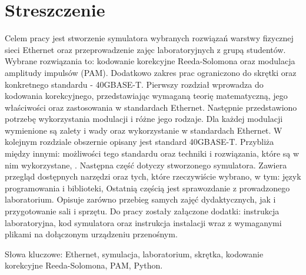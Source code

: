 \section{Streszczenie}

Celem pracy jest stworzenie symulatora wybranych rozwiązań warstwy fizycznej sieci Ethernet oraz przeprowadzenie zajęc laboratoryjnych z grupą studentów. Wybrane rozwiązania to: kodowanie korekcyjne Reeda-Solomona oraz modulacja amplitudy impulsów (PAM). Dodatkowo zakres prac ograniczono do skrętki oraz konkretnego standardu - 40GBASE-T. Pierwszy rozdział wprowadza do kodowania korekcyjnego, przedstawiając wymaganą teorię matematyczną, jego właściwości oraz zastosowania w standardach Ethernet. Następnie przedstawiono potrzebę wykorzystania modulacji i różne jego rodzaje. Dla każdej modulacji wymienione są zalety i wady oraz wykorzystanie w standardach Ethernet. W kolejnym rozdziale obszernie opisany jest standard 40GBASE-T. Przybliża między innymi: możliwości tego standardu oraz techniki i rozwiązania, które są w nim wykorzystane, . Następna część dotyczy stworzonego symulatora. Zawiera przegląd dostępnych narzędzi oraz tych, które rzeczywiście wybrano, w tym: język programowania i biblioteki, Ostatnią częścią jest sprawozdanie z prowadzonego laboratorium. Opisuje zarówno przebieg samych zajęć dydaktycznych, jak i przygotowanie sali i sprzętu. Do pracy zostały załączone dodatki: instrukcja laboratoryjna, kod symulatora oraz instrukcja instalacji wraz z wymaganymi plikami na dołączonym urządzeniu przenośnym.

Słowa kluczowe: Ethernet, symulacja, laboratorium, skrętka, kodowanie korekcyjne Reeda-Solomona, PAM, Python.